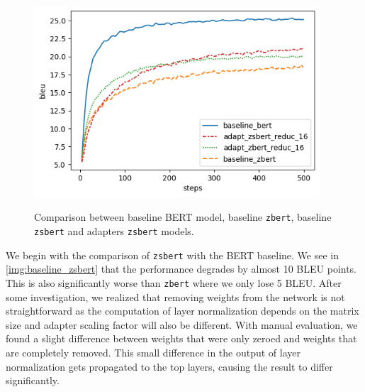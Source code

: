 \begin{figure}[]
    {\includegraphics[width=0.95\textwidth]{img/adapter_zsbert.png}}
    \centering
    \caption{Comparison between baseline BERT model, baseline \texttt{zbert}, baseline \texttt{zsbert} and adapters \texttt{zsbert} models.}
    \label{img:adapter_zsbert}
\end{figure}


We begin with the comparison of \texttt{zsbert} with the BERT baseline. We see in \cref{img:baseline_zsbert} that the performance degrades by almost 10 BLEU points. This is also significantly worse than \texttt{zbert} where we only lose 5 BLEU. After some investigation, we realized that removing weights from the network is not straightforward as the computation of layer normalization depends on the matrix size and adapter scaling factor will also be different. With manual evaluation, we found a slight difference between weights that were only zeroed and weights that are completely removed. This small difference in the output of layer normalization gets propagated to the top layers, causing the result to differ significantly.


